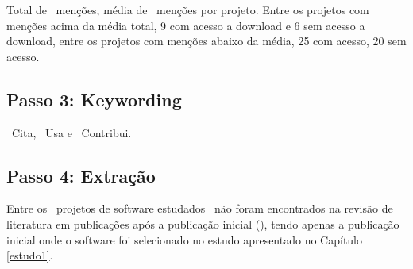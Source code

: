 Total de \ScreeningCount \ menções, média de \ScreeningMean \ menções por
projeto.  Entre os projetos com menções acima da média total, 9 com acesso a
download e 6 sem acesso a download, entre os projetos com menções abaixo da
média, 25 com acesso, 20 sem acesso.



\subsection{Passo 3: Keywording}

\CiteCount \ Cita,
\UseCount \ Usa e
\ContributeCount \ Contribui.

\subsection{Passo 4: Extração}

Entre os \SoftwareCount \ projetos de software estudados
\SoftwareNotMentionedCount \ não foram encontrados na revisão de literatura em
publicações após a publicação inicial
(), tendo apenas a publicação
inicial onde o software foi selecionado no estudo apresentado no Capítulo
\ref{estudo1}.



